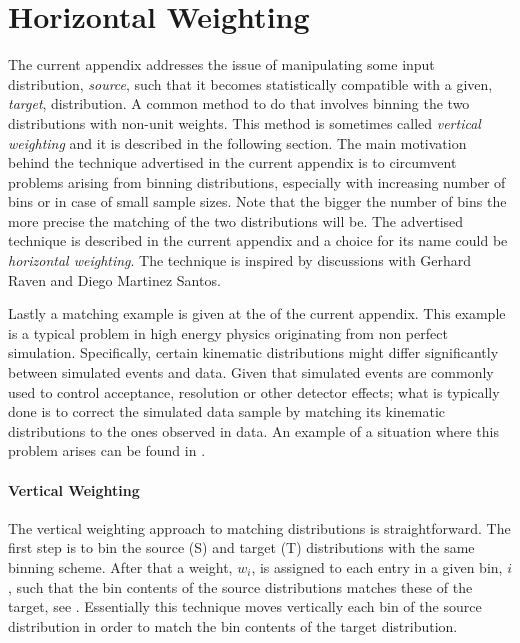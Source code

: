 
\chapter{Horizontal Weighting}
\label{AppendixB}

The current appendix addresses the issue of manipulating some input distribution, {\it source}, such that
it becomes statistically compatible with a given, {\it target}, distribution. A common method to do that
involves binning the two distributions with non-unit weights. This method is sometimes called {\it vertical weighting}
and it is described in the following section. The main motivation behind the technique advertised in the current
appendix is to circumvent problems arising from binning distributions, especially with increasing number of
bins or in case of small sample sizes. Note that the bigger the number of bins the more precise the matching
of the two distributions will be. The advertised technique is described in the current appendix and a choice for its name could be {\it horizontal weighting}.
The technique is inspired by discussions with Gerhard Raven and Diego Martinez Santos.

Lastly a matching example is given at the of the current appendix. This example is a typical problem
in high energy physics originating from non perfect simulation. Specifically, certain kinematic
distributions might differ significantly between simulated events and data. Given that simulated
events are commonly used to control acceptance, resolution or other detector effects; what is typically
done is to correct the simulated data sample by matching its kinematic distributions to the ones observed in data.
An example of a situation where this problem arises can be found in .

\subsubsection{Vertical Weighting}
The vertical weighting approach to matching distributions is straightforward.
The first step is to bin the source (S) and target (T) distributions with the same binning scheme.
After that a weight, $w_i$, is assigned to each entry in a given bin, $i$, such that the bin
contents of the source distributions matches these of the target, see .
Essentially this technique moves vertically each bin of the source distribution in order to match
the bin contents of the target distribution.

